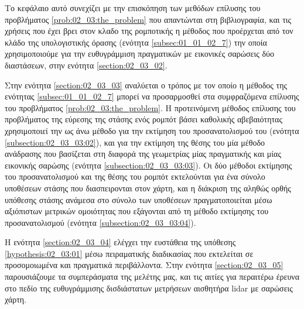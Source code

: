 Το κεφάλαιο αυτό συνεχίζει με την επισκόπηση των μεθόδων επίλυσης του
προβλήματος \ref{prob:02_03:the_problem} που απαντώνται στη βιβλιογραφία, και
τις χρήσεις που έχει βρει στον κλαδο της ρομποτικής η μέθοδος που προέρχεται
από τον κλάδο της υπολογιστικής όρασης (ενότητα \ref{subsec:01_01_02_7}) την
οποία χρησιμοποιούμε για την ευθυγράμμιση πραγματικών με εικονικές σαρώσεις δύο
διαστάσεων, στην ενότητα \ref{section:02_03_02}.

Στην ενότητα \ref{section:02_03_03} αναλύεται ο τρόπος με τον οποίο η μέθοδος
της ενότητας \ref{subsec:01_01_02_7} μπορεί να προσαρμοσθεί στα συμφραζόμενα
επίλυσης του προβλήματος \ref{prob:02_03:the_problem}. Η προτεινόμενη μέθοδος
επίλυσης του προβλήματος της εύρεσης της στάσης ενός ρομπότ βάσει καθολικής
αβεβαιότητας χρησιμοποιεί την ως άνω μέθοδο για την εκτίμηση του
προσανατολισμού του (ενότητα \ref{subsection:02_03_03:02}), και για την
εκτίμηση της θέσης του μία μέθοδο ανάδρασης που βασίζεται στη διαφορά της
γεωμετρίας μίας πραγματικής και μίας εικονικής σαρώσης (ενότητα
\ref{subsection:02_03_03:03}). Οι δύο μέθοδοι εκτίμησης του προσανατολισμού και
της θέσης του ρομπότ εκτελούνται για ένα σύνολο υποθέσεων στάσης που
διασπειρονται στον χάρτη, και η διάκριση της αληθώς ορθής υπόθεσης στάσης
ανάμεσα στο σύνολο των υποθέσεων πραγματοποιείται μέσω αξιόπιστων μετρικών
ομοιότητας που εξάγονται από τη μέθοδο εκτίμησης του προσανατολισμού (ενότητα
\ref{subsection:02_03_03:04}).

Η ενότητα \ref{section:02_03_04} ελέγχει την ευστάθεια της υπόθεσης
\ref{hypothesis:02_03:01} μέσω πειραματικής διαδικασίας που εκτελείται σε
προσομοιωμένα και πραγματικά περιβάλλοντα. Στην ενότητα \ref{section:02_03_05}
παρουσιάζουμε τα συμπεράσματα της μελέτης μας, και τις αιτίες για περαιτέρω
έρευνα στο πεδίο της ευθυγράμμισης δισδιάστατων μετρήσεων αισθητήρα lidar με
σαρώσεις χάρτη.
